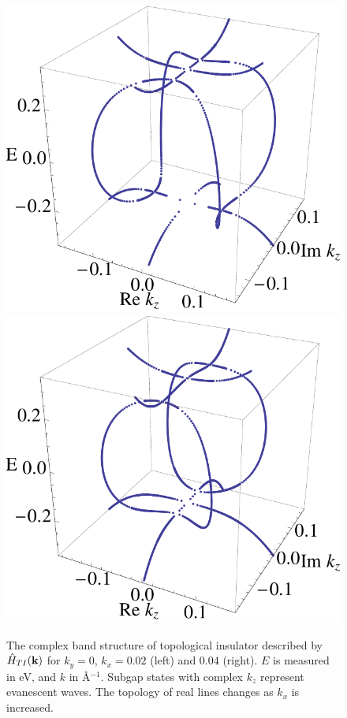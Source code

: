 \begin{figure}
\center
\includegraphics[width=.45 \textwidth]{include/f2.pdf}\includegraphics[width=.45 \textwidth]{include/f4.pdf}
\caption{The complex band structure
of topological insulator described by $\hat{H}_{TI}(\mathbf{k})$ 
for $k_y=0$, $k_x=0.02$ (left) and $0.04$ (right). $E$ is measured in eV, and $k$ in \AA$^{-1}$.
Subgap states with complex $k_z$ represent evanescent waves. 
The topology of  real lines \cite{heine63}  changes as $k_x$ is increased.  
}
\end{figure}

